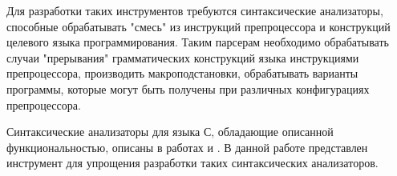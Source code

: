 Для разработки таких инструментов требуются синтаксические анализаторы, способные обрабатывать "смесь" из инструкций препроцессора и конструкций целевого языка программирования. Таким парсерам необходимо обрабатывать случаи "прерывания" грамматических конструкций языка инструкциями препроцессора, производить макроподстановки, обрабатывать варианты программы, которые могут быть получены при различных конфигурациях препроцессора.

Синтаксические анализаторы для языка С, обладающие описанной функциональностью, описаны в работах \cite{superc} и \cite{typechef}. В данной работе представлен инструмент для упрощения разработки таких синтаксических анализаторов. 
